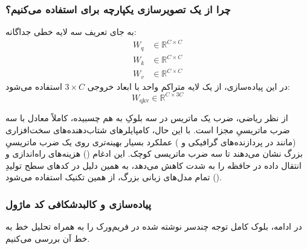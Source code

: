 \documentclass{article}
\begin{document}
\subsubsection*{ چرا از یک تصویرسازی یکپارچه برای  استفاده می‌کنیم؟}

به جای تعریف سه لایه خطی جداگانه:
\begin{align*}
	W_q &\in \mathbb{R}^{C \times C} \\
	W_k &\in \mathbb{R}^{C \times C} \\
	W_v &\in \mathbb{R}^{C \times C}
\end{align*}
در این پیاده‌سازی، از یک لایه متراکم واحد با ابعاد خروجی $3 \times C$ استفاده می‌شود:
\begin{equation}
	W_{\text{qkv}} \in \mathbb{R}^{C \times 3C}
\end{equation}

از نظر ریاضی، ضرب یک ماتریس در سه بلوکِ به هم چسبیده، کاملاً معادل با سه ضرب ماتریسیِ مجزا است. با این حال، کامپایلرهای شتاب‌دهنده‌های سخت‌افزاری (مانند  در پردازنده‌های گرافیکی و ) عملکرد بسیار بهینه‌تری روی یک ضرب ماتریسیِ بزرگ نشان می‌دهند تا سه ضرب ماتریسی کوچک. این ادغام () هزینه‌های راه‌اندازی و انتقال داده در حافظه را به شدت کاهش می‌دهد، به همین دلیل در کدهای سطح تولیدِ () تمام مدل‌های زبانی بزرگ، از همین تکنیک استفاده می‌شود.

\subsubsection*{پیاده‌سازی و کالبدشکافی کد ماژول}

در ادامه، بلوک کامل توجه چندسر نوشته شده در فریم‌ورک  را به همراه تحلیل خط به خط آن بررسی می‌کنیم.
\end{document}

